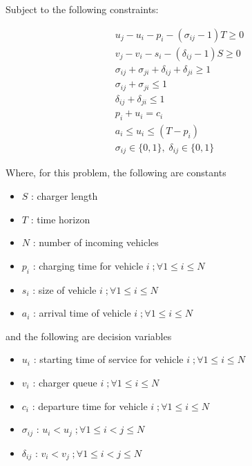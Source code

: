 \documentclass[letterpaper, 10pt, conference]{IEEEtran}
\begin{document}
Subject to the following constraints:

\begin{subequations}
\label{eq:bapconstrs}
\begin{align}
    u_j - u_i - p_i - (\sigma_{ij} - 1)T \geq 0                     \label{subeq:baptime}         \\
    v_j - v_i - s_i - (\delta_{ij} - 1)S \geq 0                     \label{subeq:bapspace}        \\
    \sigma_{ij} + \sigma_{ji} + \delta_{ij} + \delta_{ji} \geq 1    \label{subeq:bapvalid_pos}    \\
    \sigma_{ij} + \sigma_{ji} \leq 1                                \label{subeq:bapsigma}        \\
    \delta_{ij} + \delta_{ji} \leq 1                                \label{subeq:bapdelta}        \\
    p_i + u_i = c_i                                                 \label{subeq:bapdetach}       \\
    a_i \leq u_i \leq (T - p_i)                                     \label{subeq:bapvalid_starts} \\
    \sigma_{ij} \in \{0,1\},\;\delta_{ij} \in \{0,1\}               \label{subeq:bapsdspace}
\end{align}
\end{subequations}

\noindent
Where, for this problem, the following are constants

\begin{itemize}
	\item \(S\)   : charger length
	\item \(T\)   : time horizon
	\item \(N\)   : number of incoming vehicles
	\item \(p_i\) : charging time for vehicle \(i\;; \forall 1 \leq i \leq N\)
	\item \(s_i\) : size of vehicle \(i\;; \forall 1 \leq i \leq N\)
	\item \(a_i\) : arrival time of vehicle \(i\;; \forall 1 \leq i \leq N\)
\end{itemize}

\noindent
and the following are decision variables

\begin{itemize}
    \item \(u_i\)         : starting time of service for vehicle \(i\;; \forall 1 \leq i \leq N\)
    \item \(v_i\)         : charger queue \(i\;; \forall 1 \leq i \leq N\)
    \item \(c_i\)         : departure time for vehicle \(i\;; \forall 1 \leq i \leq N\)
    \item \(\sigma_{ij}\) : \(u_i < u_j\;; \forall 1 \leq i < j \leq N\)
    \item \(\delta_{ij}\) : \(v_i < v_j\;; \forall 1 \leq i < j \leq N\)
\end{itemize}
\end{document}
